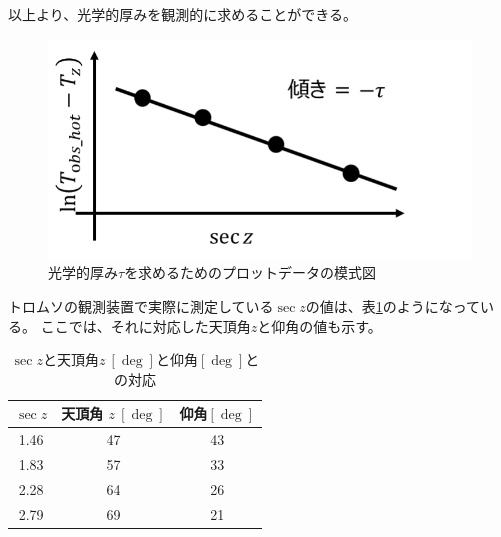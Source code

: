 以上より、光学的厚みを観測的に求めることができる。\par
\begin{figure}[htbp]
    \centering
    \includegraphics[width=\linewidth]{master_thesis_contents/master_thesis_fig/opticaldepth_slope_tau.pdf}
    \caption{光学的厚み$\tau$を求めるためのプロットデータの模式図}
    \label{fig:opticaldepth_slope_tau}
\end{figure}
トロムソの観測装置で実際に測定している$\sec z$の値は、表\ref{tb:secz_zdeg}のようになっている。
ここでは、それに対応した天頂角$z$と仰角の値も示す。
\begin{table}[htbp]
    \centering
    \caption{$\sec z$と天頂角$z\ [ \deg ]$と仰角$[ \deg ]$との対応}
    \label{tb:secz_zdeg}
    \setlength{\belowcaptionskip}{5mm}
    \begin{tabular}{ccc}
    \hline
    $\sec z$ & 天頂角 $z\ [ \deg ]$ & 仰角$[ \deg ]$ \\ \hline
    1.46 & 47 & 43 \\ \hline
    1.83 & 57 & 33 \\ \hline
    2.28 & 64 & 26 \\ \hline
    2.79 & 69 & 21 \\ \hline
    \end{tabular}
\end{table}


